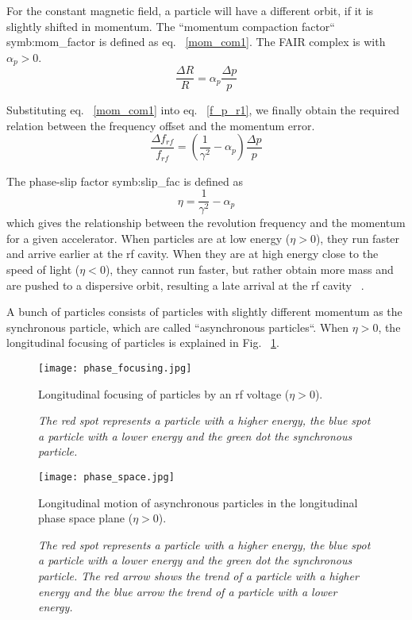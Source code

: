 For the constant magnetic field, a particle will have a different orbit, if it is slightly shifted in momentum. The ``momentum compaction factor`` \gls{symb:mom_factor} is defined as eq. ~\ref{mom_com1}. The FAIR complex is with $\alpha_p>0$.
\begin{equation}
\frac{\Delta R}{R}=\alpha_p\frac{\Delta p}{p}\label{mom_com1}
\end{equation} 

Substituting eq. ~\ref{mom_com1} into eq. ~\ref{f_p_r1}, we finally obtain the required relation between the frequency offset and the momentum error.
\begin{equation}
\frac{\Delta f_{\mathit{rf}}}{f_{\mathit{rf}}} = (\frac{1}{\gamma^2}-\alpha_{\mathit{p}})\frac{\Delta{p}}{p}
\label{eq:phaseP1}
\end{equation}

The phase-slip factor \gls{symb:slip_fac} is defined as
\begin{equation}
\label{eq:phse_slip}
\eta =\frac{1}{\gamma^2}-\alpha_{\mathit{p}}
\end{equation}
which gives the relationship between the revolution frequency and the momentum for a given accelerator. When particles are at low energy ($\eta > 0$), they run faster and arrive earlier at the rf cavity. When they are at high energy close to the speed of light ($\eta < 0$), they cannot run faster, but rather obtain more mass and are pushed to a dispersive orbit, resulting a late arrival at the rf cavity ~\cite{lee_accelerator_2011}. 

A bunch of particles consists of particles with slightly different momentum as the synchronous particle, which are called ``asynchronous particles``. When $\eta > 0$, the longitudinal focusing of particles is explained in Fig. ~\ref{phase_focusing}. 
\begin{figure}[H]
   \centering   
   \texttt{[image: phase\_focusing.jpg]}
   \caption{Longitudinal focusing of particles by an rf voltage ($\eta > 0$).}
	\caption*{\textsl{\small{The red spot represents a particle with a higher energy, the blue spot a particle with a lower energy and the green dot the synchronous particle.}}}
   \label{phase_focusing}
\end{figure}

\begin{figure}[H]
   \centering   
   \texttt{[image: phase\_space.jpg]}
   \caption{Longitudinal motion of asynchronous particles in the longitudinal phase space plane ($\eta > 0$).}
	\caption*{\textsl{\small{The red spot represents a particle with a higher energy, the blue spot a particle with a lower energy and the green dot the synchronous particle. The red arrow shows the trend of a particle with a higher energy and the blue arrow the trend of a particle with a lower energy.}}}
   \label{phase_space}
\end{figure}

